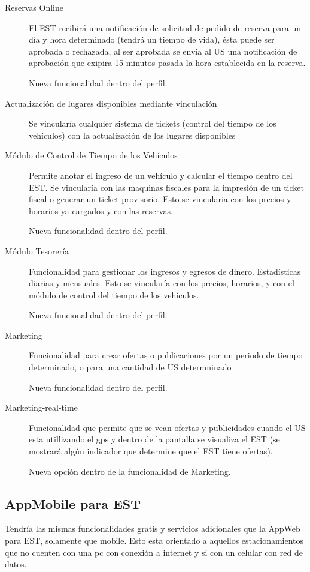 \documentclass[spanish, DIV=calc, paper=a4, fontsize=11pt, twocolumn]{scrartcl}	 %
\begin{document}
\begin{description}
	
	\item[Reservas Online] El EST recibirá una notificación de solicitud de pedido de reserva para un día y hora determinado (tendrá un tiempo de vida), ésta puede ser aprobada o rechazada, al ser aprobada se envía al US una notificación de aprobación que exipira 15 minutos pasada la hora establecida en la reserva.

Nueva funcionalidad dentro del perfil. 

	\item[Actualización de lugares disponibles mediante vinculación] Se vincularía cualquier sistema de tickets (control del tiempo de los vehículos) con la actualización de los lugares disponibles

	\item[Módulo de Control de Tiempo de los Vehículos]	Permite anotar el ingreso de un vehículo y calcular el tiempo dentro del EST. Se vincularía con las maquinas fiscales para la impresión de un ticket fiscal o generar un ticket provisorio. Esto se vincularia con los precios y horarios ya cargados y con las reservas.

Nueva funcionalidad dentro del perfil. 

	\item[Módulo Tesorería]	Funcionalidad para gestionar los ingresos y egresos de dinero. Estadísticas diarias y mensuales. Esto se vincularía con los precios, horarios, y con el módulo de control del tiempo de los vehículos.

Nueva funcionalidad dentro del perfil.
	
	\item[Marketing] Funcionalidad para crear ofertas o publicaciones por un periodo de tiempo determinado, o para una cantidad de US determninado

Nueva funcionalidad dentro del perfil.

	\item[Marketing-real-time] Funcionalidad que permite que se vean ofertas y publicidades cuando el US esta utillizando el gps y dentro de la pantalla se visualiza el EST (se mostrará algún indicador que determine que el EST tiene ofertas).

Nueva opción dentro de la funcionalidad de Marketing.

\end{description}

\subsection{AppMobile para EST}
Tendría las mismas funcionalidades gratis y servicios adicionales que la AppWeb para EST, solamente que mobile. Esto esta orientado a aquellos estacionamientos que no cuenten con una pc con conexión a internet y si con un celular con red de datos.
\end{document}
